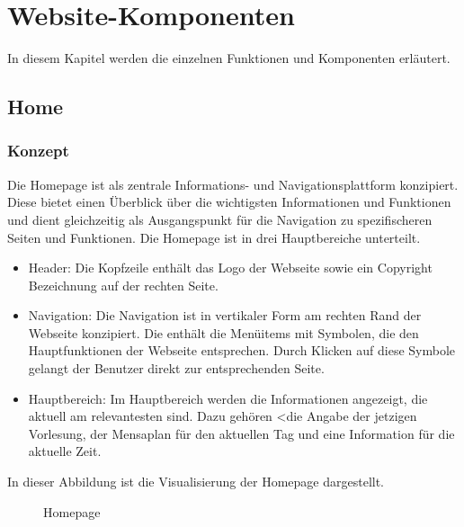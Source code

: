 \section{Website-Komponenten}
In diesem Kapitel werden die einzelnen Funktionen und Komponenten erläutert.
\subsection{Home}
\subsubsection{Konzept}
Die Homepage ist als zentrale Informations- und Navigationsplattform konzipiert. Diese bietet einen Überblick über die wichtigsten Informationen und Funktionen und dient gleichzeitig als Ausgangspunkt für die Navigation zu spezifischeren Seiten und Funktionen.
Die Homepage ist in drei Hauptbereiche unterteilt.
\begin{itemize}
	\item Header: Die Kopfzeile enthält das Logo der Webseite sowie ein Copyright Bezeichnung auf der rechten Seite. 
	\item Navigation: Die Navigation ist in vertikaler Form am rechten Rand der Webseite konzipiert. Die enthält die Menüitems mit Symbolen, die den Hauptfunktionen der Webseite entsprechen. Durch Klicken auf diese Symbole gelangt der Benutzer direkt zur entsprechenden Seite.
	\item Hauptbereich: Im Hauptbereich werden die Informationen angezeigt, die aktuell am relevantesten sind. Dazu gehören <die Angabe der jetzigen Vorlesung, der Mensaplan für den aktuellen Tag und eine Information für die aktuelle Zeit.
\end{itemize} 
In dieser Abbildung ist die Visualisierung der Homepage dargestellt.

\begin{figure}[htbp]
	\centering
	\caption{Homepage}
\end{figure}
\newpage
